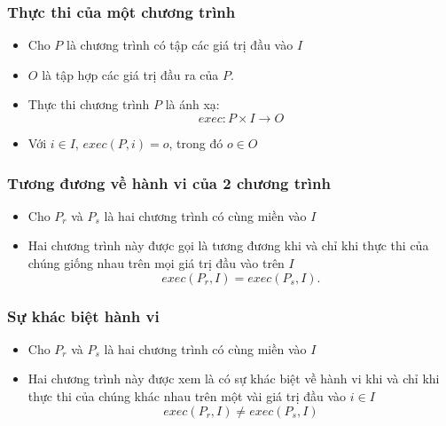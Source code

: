 \documentclass{beamer}
\begin{document}
\begin{frame}
  \frametitle{Thực thi của một chương trình}
\begin{block}{}
	\begin{itemize}
		\item Cho $P$ là chương trình có tập các giá trị đầu vào $I$
		\item $O$ là tập hợp các giá trị đầu ra của $P$. 
		\item Thực thi chương trình $ P $ là ánh xạ: 
		\[exec: P \times I \rightarrow O\]
		\item Với $i \in I$, $exec(P, i) = o$, trong đó $o \in O$
	\end{itemize}
\end{block}
   
\end{frame}


\begin{frame}
  \frametitle{Tương đương về hành vi của 2 chương trình}
  \begin{block}{}
  	\begin{itemize}
  		\item Cho $P_r$ và $P_s$ là hai chương trình có cùng miền vào $I$ 
  		\item Hai chương trình này được gọi là tương đương khi và chỉ
  		khi thực thi của chúng giống nhau trên mọi giá trị đầu vào trên $I$
  		\[exec(P_r, I) = exec(P_s, I).\]
  	\end{itemize}
  \end{block} 
\end{frame}


\begin{frame}
  \frametitle{Sự khác biệt hành vi}
  \begin{block}{}
  \begin{itemize}
  	\item Cho $P_r$ và $P_s$ là hai chương trình có cùng miền vào $I$ 
  	\item Hai chương trình này được xem là có sự khác biệt về
  	hành vi khi và chỉ khi thực thi của chúng khác nhau trên một vài giá
  	trị đầu vào $i \in I$
  	\[exec(P_r, I) \neq exec(P_s, I)\]
  \end{itemize}
  \end{block}
\end{frame}
\end{document}

